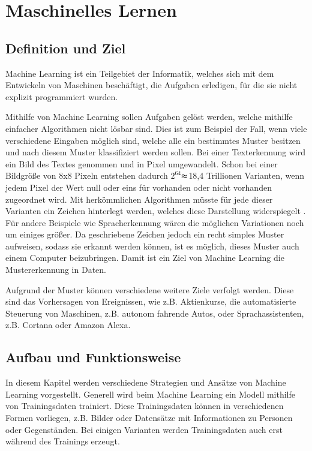 \chapter{Maschinelles Lernen}
\label{chap:maschinellesLernen}
\chapterauthor{\authorMarco}
\section{Definition und Ziel}
\label{sec:definitionZiel}
Machine Learning ist ein Teilgebiet der Informatik, welches sich mit dem Entwickeln von Maschinen beschäftigt, die Aufgaben erledigen, für die sie nicht explizit programmiert wurden.

Mithilfe von Machine Learning sollen Aufgaben gelöst werden, welche mithilfe einfacher Algorithmen nicht lösbar sind. Dies ist zum Beispiel der Fall, wenn viele verschiedene Eingaben möglich sind, welche alle ein bestimmtes Muster besitzen und nach diesem Muster klassifiziert werden sollen. Bei einer Texterkennung wird ein Bild des Textes genommen und in Pixel umgewandelt. Schon bei einer Bildgröße von 8x8 Pixeln entstehen dadurch $2^{64}$$\thickapprox$18,4 Trillionen Varianten, wenn jedem Pixel der Wert null oder eins für vorhanden oder nicht vorhanden zugeordnet wird. Mit herkömmlichen Algorithmen müsste für jede dieser Varianten ein Zeichen hinterlegt werden, welches diese Darstellung widerspiegelt \cite[vgl.][S. 25f.]{NeuNetze}. Für andere Beispiele wie Spracherkennung wären die möglichen Variationen noch um einiges größer. Da geschriebene Zeichen jedoch ein recht simples Muster aufweisen, sodass sie erkannt werden können, ist es möglich, dieses Muster auch einem Computer beizubringen. Damit ist ein Ziel von Machine Learning die Mustererkennung in Daten.

Aufgrund der Muster können verschiedene weitere Ziele verfolgt werden. Diese sind das Vorhersagen von Ereignissen, wie z.B. Aktienkurse, die automatisierte Steuerung von Maschinen, z.B. autonom fahrende Autos, oder Sprachassistenten, z.B. Cortana oder Amazon Alexa.

\section{Aufbau und Funktionsweise}
\label{sec:aufbauFunktionsweise}
In diesem Kapitel werden verschiedene Strategien und Ansätze von Machine Learning vorgestellt. Generell wird beim Machine Learning ein Modell mithilfe von Trainingsdaten trainiert. Diese Trainingsdaten können in verschiedenen Formen vorliegen, z.B. Bilder oder Datensätze mit Informationen zu Personen oder Gegenständen. Bei einigen Varianten werden Trainingsdaten auch erst während des Trainings erzeugt.

